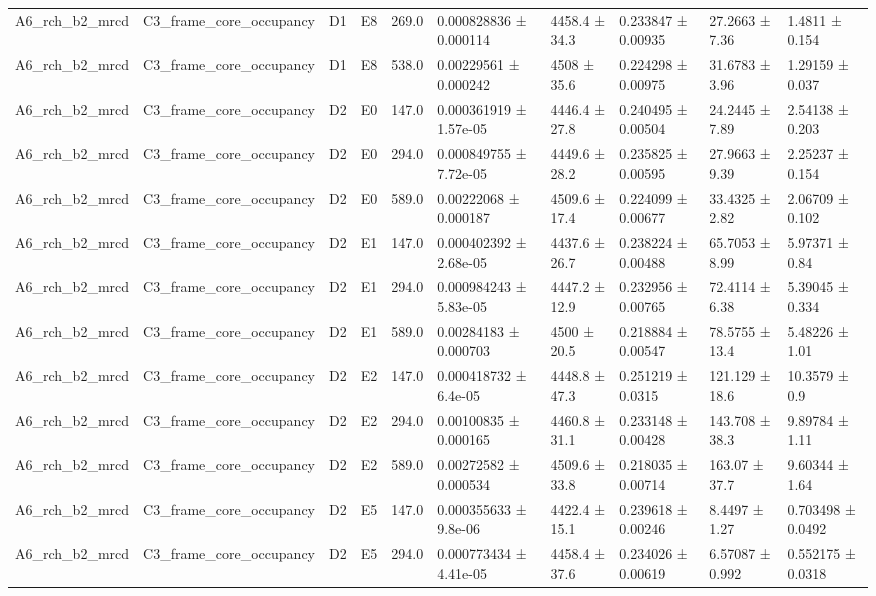 \begin{table}
\begin{tabular}{llllllllll}
A6\_rch\_b2\_mrcd & C3\_frame\_core\_occupancy & D1 & E8 & 269.0 & 0.000828836 ± 0.000114 & 4458.4 ± 34.3 & 0.233847 ± 0.00935 & 27.2663 ± 7.36 & 1.4811 ± 0.154 \\
A6\_rch\_b2\_mrcd & C3\_frame\_core\_occupancy & D1 & E8 & 538.0 & 0.00229561 ± 0.000242 & 4508 ± 35.6 & 0.224298 ± 0.00975 & 31.6783 ± 3.96 & 1.29159 ± 0.037 \\
A6\_rch\_b2\_mrcd & C3\_frame\_core\_occupancy & D2 & E0 & 147.0 & 0.000361919 ± 1.57e-05 & 4446.4 ± 27.8 & 0.240495 ± 0.00504 & 24.2445 ± 7.89 & 2.54138 ± 0.203 \\
A6\_rch\_b2\_mrcd & C3\_frame\_core\_occupancy & D2 & E0 & 294.0 & 0.000849755 ± 7.72e-05 & 4449.6 ± 28.2 & 0.235825 ± 0.00595 & 27.9663 ± 9.39 & 2.25237 ± 0.154 \\
A6\_rch\_b2\_mrcd & C3\_frame\_core\_occupancy & D2 & E0 & 589.0 & 0.00222068 ± 0.000187 & 4509.6 ± 17.4 & 0.224099 ± 0.00677 & 33.4325 ± 2.82 & 2.06709 ± 0.102 \\
A6\_rch\_b2\_mrcd & C3\_frame\_core\_occupancy & D2 & E1 & 147.0 & 0.000402392 ± 2.68e-05 & 4437.6 ± 26.7 & 0.238224 ± 0.00488 & 65.7053 ± 8.99 & 5.97371 ± 0.84 \\
A6\_rch\_b2\_mrcd & C3\_frame\_core\_occupancy & D2 & E1 & 294.0 & 0.000984243 ± 5.83e-05 & 4447.2 ± 12.9 & 0.232956 ± 0.00765 & 72.4114 ± 6.38 & 5.39045 ± 0.334 \\
A6\_rch\_b2\_mrcd & C3\_frame\_core\_occupancy & D2 & E1 & 589.0 & 0.00284183 ± 0.000703 & 4500 ± 20.5 & 0.218884 ± 0.00547 & 78.5755 ± 13.4 & 5.48226 ± 1.01 \\
A6\_rch\_b2\_mrcd & C3\_frame\_core\_occupancy & D2 & E2 & 147.0 & 0.000418732 ± 6.4e-05 & 4448.8 ± 47.3 & 0.251219 ± 0.0315 & 121.129 ± 18.6 & 10.3579 ± 0.9 \\
A6\_rch\_b2\_mrcd & C3\_frame\_core\_occupancy & D2 & E2 & 294.0 & 0.00100835 ± 0.000165 & 4460.8 ± 31.1 & 0.233148 ± 0.00428 & 143.708 ± 38.3 & 9.89784 ± 1.11 \\
A6\_rch\_b2\_mrcd & C3\_frame\_core\_occupancy & D2 & E2 & 589.0 & 0.00272582 ± 0.000534 & 4509.6 ± 33.8 & 0.218035 ± 0.00714 & 163.07 ± 37.7 & 9.60344 ± 1.64 \\
A6\_rch\_b2\_mrcd & C3\_frame\_core\_occupancy & D2 & E5 & 147.0 & 0.000355633 ± 9.8e-06 & 4422.4 ± 15.1 & 0.239618 ± 0.00246 & 8.4497 ± 1.27 & 0.703498 ± 0.0492 \\
A6\_rch\_b2\_mrcd & C3\_frame\_core\_occupancy & D2 & E5 & 294.0 & 0.000773434 ± 4.41e-05 & 4458.4 ± 37.6 & 0.234026 ± 0.00619 & 6.57087 ± 0.992 & 0.552175 ± 0.0318 \\

\end{tabular}
\end{table}
